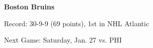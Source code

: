 \textbf{Boston Bruins}

Record: 30-9-9 (69 points), 1st in NHL Atlantic 

Next Game: Saturday, Jan. 27 vs. PHI